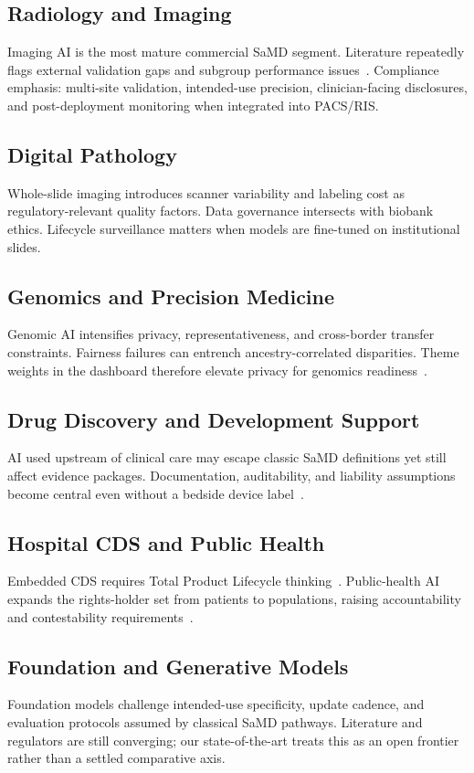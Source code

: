 \subsection{Radiology and Imaging}
Imaging AI is the most mature commercial SaMD segment. Literature repeatedly flags external validation gaps and subgroup performance issues~\cite{wu2021,seyedkalantari2021}. Compliance emphasis: multi-site validation, intended-use precision, clinician-facing disclosures, and post-deployment monitoring when integrated into PACS/RIS.

\subsection{Digital Pathology}
Whole-slide imaging introduces scanner variability and labeling cost as regulatory-relevant quality factors. Data governance intersects with biobank ethics. Lifecycle surveillance matters when models are fine-tuned on institutional slides.

\subsection{Genomics and Precision Medicine}
Genomic AI intensifies privacy, representativeness, and cross-border transfer constraints. Fairness failures can entrench ancestry-correlated disparities. Theme weights in the dashboard therefore elevate privacy for genomics readiness~\cite{gerke2020}.

\subsection{Drug Discovery and Development Support}
AI used upstream of clinical care may escape classic SaMD definitions yet still affect evidence packages. Documentation, auditability, and liability assumptions become central even without a bedside device label~\cite{price2019}.

\subsection{Hospital CDS and Public Health}
Embedded CDS requires Total Product Lifecycle thinking~\cite{hwang2019,petersen2022}. Public-health AI expands the rights-holder set from patients to populations, raising accountability and contestability requirements~\cite{who2021}.

\subsection{Foundation and Generative Models}
Foundation models challenge intended-use specificity, update cadence, and evaluation protocols assumed by classical SaMD pathways. Literature and regulators are still converging; our state-of-the-art treats this as an open frontier rather than a settled comparative axis.

